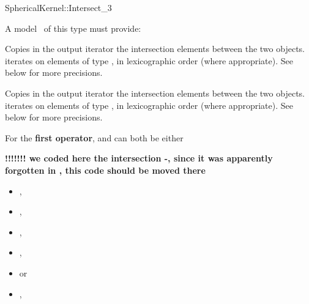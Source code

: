 \begin{ccRefFunctionObjectConcept}{SphericalKernel::Intersect_3}

\ccRefines



A model \ccVar\ of this type must provide:

{Copies in the output iterator the intersection elements between the
two objects.  iterates on
elements of type , in lexicographic order
(where appropriate). See below for more precisions.}

{Copies in the output iterator the intersection elements between the
two objects.  iterates on
elements of type , in lexicographic order 
(where appropriate). See below for more precisions.}

For the \textbf{first operator},  and  can both 
be either

\textbf{!!!!!!! we coded here the intersection -, 
since it was apparently forgotten in , this code
should be moved there}

\begin{itemize}
\item {} ,
\item {} ,
\item {} ,
\item {} ,
\item {}  or
\item {} ,
\end{itemize} 


\end{ccRefFunctionObjectConcept}
